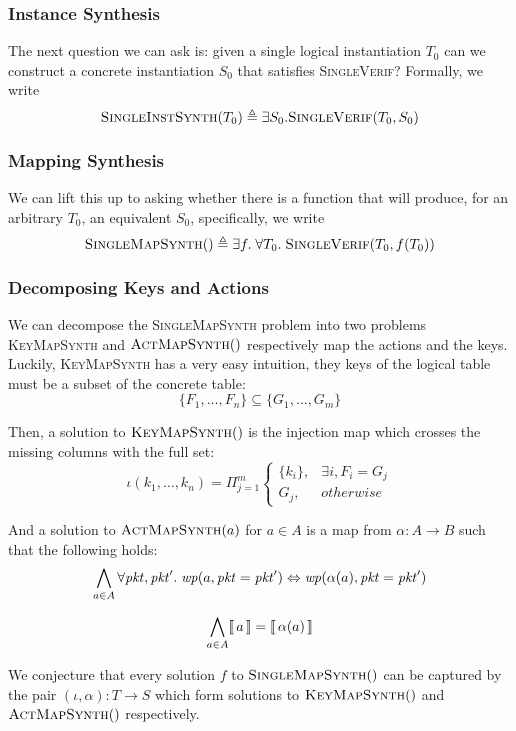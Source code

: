 \subsubsection{Instance Synthesis}

The next question we can ask is: given a single logical instantiation
$T_0$ can we construct a concrete instantiation $S_0$ that satisfies 
\textsc{SingleVerif}? Formally, we write
\[\textsc{SingleInstSynth}(T_0) \triangleq \exists
  S_0. \textsc{SingleVerif}(T_0, S_0)\]

\subsubsection{Mapping Synthesis}

We can lift this up to asking whether there is a function that will
produce, for an arbitrary $T_0$, an equivalent $S_0$, specifically, we write
\[\textsc{SingleMapSynth}() \triangleq \exists f. \; \forall T_0.\;
  \textsc{SingleVerif}(T_0, f(T_0))\]

\subsubsection{Decomposing Keys and Actions}

We can decompose the \textsc{SingleMapSynth} problem into two problems
\textsc{KeyMapSynth} and $\textsc{ActMapSynth}()$ respectively map the
actions and the keys. Luckily, \textsc{KeyMapSynth} has a very easy
intuition, they keys of the logical table must be a subset of the
concrete table:
\[\{F_1, \ldots, F_n\} \subseteq \{G_1, \ldots, G_m\}\]

Then, a solution to $\textsc{KeyMapSynth}()$ is the injection map which crosses the missing columns with the full set:
\[\displaystyle \iota (k_1, \ldots, k_n) = \Pi_{j=1}^m \begin{cases}
    \{k_i\}, & \exists i,  F_i = G_j \\
    G_j, & \mathit{otherwise}
    \end{cases}
\]

And a solution to $\textsc{ActMapSynth}(a)$ for $a \in A$ is a map
from $\alpha : A \to B$ such that the following holds:
\[\bigwedge_{a \in A} \forall \mathit{pkt},\mathit{pkt}'.\; \mathit{wp}(a, \mathit{pkt} = \mathit{pkt}')
  \Leftrightarrow \mathit{wp}(\alpha(a), \mathit{pkt} = \mathit{pkt}')\] 

\[\bigwedge_{a \in A} \llbracket\,a\,\rrbracket = \llbracket\,\alpha(a)\,\rrbracket\]

We conjecture that every solution $f$ to $\textsc{SingleMapSynth}()$
can be captured by the pair $(\iota, \alpha) : T \to S$ which form
solutions to $\textsc{KeyMapSynth}()$ and $\textsc{ActMapSynth}()$
respectively.






